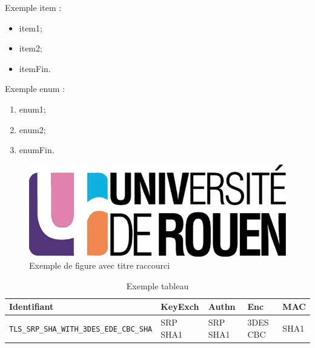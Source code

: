 Exemple item  :
\begin{itemize}
\item item1;
\item item2;
\item itemFin.\\
\end{itemize}

Exemple enum : 
\begin{enumerate}
\item enum1;
\item enum2;
\item enumFin.\\
\end{enumerate}


\begin{figure}[H]
\begin{center}
\includegraphics[scale=0.2]{images/logo_univ.png}
\end{center}
\caption[Exemple 1]{Exemple de figure avec titre raccourci}
\label{fig1}
\end{figure}


\begin{table}
\centering
\begin{tabularx}{17cm}{|l|l|l|X|l|}
\hline
\textbf{Identifiant} & \textbf{KeyExch} & \textbf{Authn}& \textbf{Enc}& \textbf{MAC}\\
\hline
\verb+TLS_SRP_SHA_WITH_3DES_EDE_CBC_SHA+&SRP SHA1&SRP SHA1&3DES CBC&SHA1\\
\hline
\end{tabularx}
\caption{Exemple tableau}
\label{tableauEx}
\end{table}

